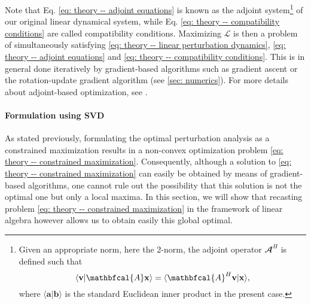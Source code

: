       Note that Eq. \eqref{eq: theory -- adjoint equations} is known as the adjoint system\footnote{
      Given an appropriate norm, here the 2-norm, the adjoint operator $\mathbfcal{A}^H$ is defined such that
      \begin{equation}
        \langle \mathbf{v} \vert \mathbfcal{A} \mathbf{x} \rangle = \langle \mathbfcal{A}^H \mathbf{v} \vert \mathbf{x} \rangle,
        \notag
      \end{equation}
      where $\langle \mathbf{a} \vert \mathbf{b} \rangle$ is the standard Euclidean inner product in the present case.
      }
      of our original linear dynamical system, while Eq. \eqref{eq: theory -- compatibility conditions} are called compatibility conditions. Maximizing $\mathcal{L}$ is then a problem of simultaneously satisfying \eqref{eq: theory -- linear perturbation dynamics}, \eqref{eq: theory -- adjoint equations} and \eqref{eq: theory -- compatibility conditions}. This is in general done iteratively by gradient-based algorithms such as gradient ascent or the rotation-update gradient algorithm (see \textsection \ref{sec: numerics}). For more details about adjoint-based optimization, see \cite{book:boyd:2004, nonlinear_optimal:kerswell:2014}.

      \paragraph{Formulation using SVD}
      \label{paragraph: theory -- optimal perturbation svd}

      As stated previously, formulating the optimal perturbation analysis as a constrained maximization results in a non-convex optimization problem \eqref{eq: theory -- constrained maximization}. Consequently, although a solution to \eqref{eq: theory -- constrained maximization} can easily be obtained by means of gradient-based algorithms, one cannot rule out the possibility that this solution is not the optimal one but only a local maxima. In this section, we will show that recasting problem \eqref{eq: theory -- constrained maximization} in the framework of linear algebra however allows us to obtain easily this global optimal.

